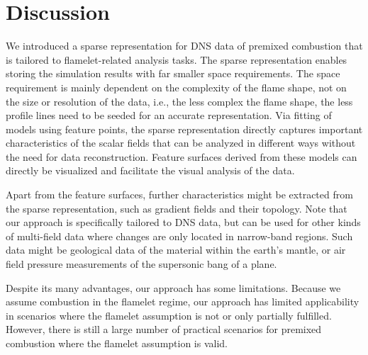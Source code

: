 \section{Discussion}
\label{sec:conclusion}
%
We introduced a sparse representation for \ac{DNS} data of premixed combustion
that is tailored to flamelet-related analysis tasks.
%
The sparse representation enables storing the simulation results with far
smaller space requirements.
%
The space requirement is mainly dependent on the complexity of the flame shape,
not on the size or resolution of the data, i.e., the less complex the flame
shape, the less profile lines need to be seeded for an accurate representation.
%
Via fitting of models using feature points, the sparse representation directly
captures important characteristics of the scalar fields that can be analyzed in
different ways without the need for data reconstruction.
%
Feature surfaces derived from these models can directly be visualized and
facilitate the visual analysis of the data.
%


Apart from the feature surfaces, further characteristics might be extracted from
the sparse representation, such as gradient fields and their topology.
%
Note that our approach is specifically tailored to \ac{DNS} data, but can be
used for other kinds of multi-field data where changes are only located in
narrow-band regions.
%
Such data might be geological data of the material within the earth's mantle, or
air field pressure measurements of the supersonic bang of a plane.

%
Despite its many advantages, our approach has some limitations.
%
Because we assume combustion in the flamelet regime, our approach has limited
applicability in scenarios where the flamelet assumption is not or only
partially fulfilled.
%
However, there is still a large number of practical scenarios for premixed
combustion where the flamelet assumption is valid.
%

